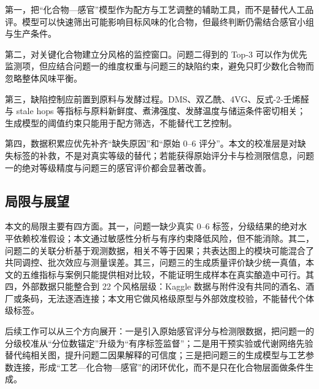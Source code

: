 第一，把“化合物—感官”模型作为配方与工艺调整的辅助工具，而不是替代人工品评。模型可以快速筛出可能影响目标风味的化合物，但最终判断仍需结合感官小组与生产条件。

第二，对关键化合物建立分风格的监控窗口。问题二得到的 Top-3 可以作为优先监测项，但应结合问题一的维度权重与问题三的缺陷约束，避免只盯少数化合物而忽略整体风味平衡。

第三，缺陷控制应前置到原料与发酵过程。DMS、双乙酰、4VG、反式-2-壬烯醛与 stale hops 等指标与原料新鲜度、煮沸强度、发酵温度与储运条件密切相关；生成模型的阈值约束只能用于配方筛选，不能替代工艺控制。

第四，数据积累应优先补齐“缺失原因”和“原始 0--6 评分”。本文的校准层是对缺失标签的补救，不是对真实等级的替代；若能获得原始评分卡与检测限信息，问题一的绝对等级精度与问题三的感官评价都会显著改善。

\subsection{局限与展望}

本文的局限主要有四方面。其一，问题一缺少真实 0--6 标签，分级结果的绝对水平依赖校准假设；本文通过敏感性分析与有序约束降低风险，但不能消除。其二，问题二的关联分析基于观测数据，相关不等于因果；共表达图上的模块可能混合了共同调控、批次效应与测量误差。其三，问题三的生成质量评价缺少统一真值，本文的五维指标与案例只能提供相对比较，不能证明生成样本在真实酿造中可行。其四，外部数据只能整合到 22 个风格层级：Kaggle 数据与附件没有共同的酒名、酒厂或条码，无法逐酒连接；本文用它做风格级原型与外部效度校验，不能替代个体级标签\citep{kaggle2026topbeer}。

后续工作可以从三个方向展开：一是引入原始感官评分与检测限数据，把问题一的分级校准从“分位数锚定”升级为“有序标签监督”；二是用干预实验或代谢网络先验替代纯相关图，提升问题二因果解释的可信度；三是把问题三的生成模型与工艺参数连接，形成“工艺—化合物—感官”的闭环优化，而不是只在化合物层面做条件生成。
